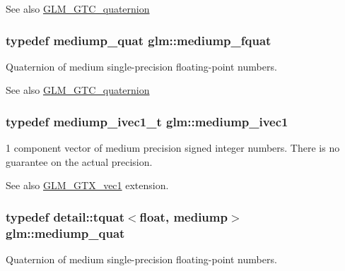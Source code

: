 \begin{DoxySeeAlso}{See also}
\hyperlink{group__gtc__quaternion}{G\+L\+M\+\_\+\+G\+T\+C\+\_\+quaternion} 
\end{DoxySeeAlso}
\subsubsection[{\texorpdfstring{mediump\+\_\+fquat}{mediump_fquat}}]{\setlength{\rightskip}{0pt plus 5cm}typedef {\bf mediump\+\_\+quat} {\bf glm\+::mediump\+\_\+fquat}}\hypertarget{namespaceglm_a154ae157e20a677e5663d97b923b1053}{}\label{namespaceglm_a154ae157e20a677e5663d97b923b1053}
Quaternion of medium single-\/precision floating-\/point numbers.

\begin{DoxySeeAlso}{See also}
\hyperlink{group__gtc__quaternion}{G\+L\+M\+\_\+\+G\+T\+C\+\_\+quaternion} 
\end{DoxySeeAlso}
\subsubsection[{\texorpdfstring{mediump\+\_\+ivec1}{mediump_ivec1}}]{\setlength{\rightskip}{0pt plus 5cm}typedef {\bf mediump\+\_\+ivec1\+\_\+t} {\bf glm\+::mediump\+\_\+ivec1}}\hypertarget{namespaceglm_a7efcceaaa791c2380d1b17bd7baa45ee}{}\label{namespaceglm_a7efcceaaa791c2380d1b17bd7baa45ee}
1 component vector of medium precision signed integer numbers. There is no guarantee on the actual precision. \begin{DoxySeeAlso}{See also}
\hyperlink{group__gtx__vec1}{G\+L\+M\+\_\+\+G\+T\+X\+\_\+vec1} extension. 
\end{DoxySeeAlso}
\subsubsection[{\texorpdfstring{mediump\+\_\+quat}{mediump_quat}}]{\setlength{\rightskip}{0pt plus 5cm}typedef {\bf detail\+::tquat}$<$float, mediump$>$ {\bf glm\+::mediump\+\_\+quat}}\hypertarget{namespaceglm_aa891775f83d9da605b5dd0dc34a3ef62}{}\label{namespaceglm_aa891775f83d9da605b5dd0dc34a3ef62}
Quaternion of medium single-\/precision floating-\/point numbers.

